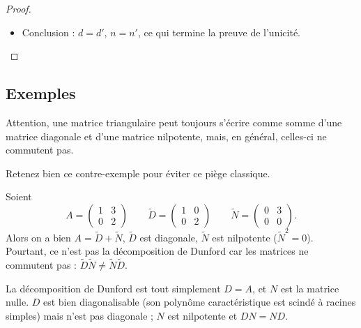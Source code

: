 \documentclass[12pt, class=report,crop=false]{standalone}
\begin{document}
\begin{proof}
\begin{enumerate}
\begin{itemize}
    \item Conclusion : $d=d'$, $n=n'$, ce qui termine la preuve de l'unicité. 
    
  \end{itemize}
   
\end{enumerate}
\end{proof}



\subsection{Exemples}



Attention, une matrice triangulaire peut toujours s'écrire 
comme somme d'une matrice diagonale et d'une matrice nilpotente, 
mais, en général, celles-ci ne commutent pas. 

Retenez bien ce contre-exemple pour éviter ce piège classique.
\begin{exemple}
Soient 
$$A = \begin{pmatrix}
1 & 3\\
0 & 2
\end{pmatrix}
\qquad \tilde D =  \begin{pmatrix}
1 & 0\\
0 & 2
\end{pmatrix}
\qquad \tilde N =  \begin{pmatrix}
0 & 3\\
0 & 0
\end{pmatrix}.$$
Alors on a bien $A = \tilde D + \tilde N$, $\tilde D$ est diagonale,
$\tilde N$ est nilpotente ($\tilde N^2 = 0$). Pourtant, ce n'est pas la décomposition de Dunford car les matrices ne commutent pas : $\tilde D \tilde N \neq \tilde N \tilde D$.
 
La décomposition de Dunford est tout simplement $D = A$, et $N$ est la matrice nulle.
$D$ est bien diagonalisable (son polynôme caractéristique est scindé à racines simples)
mais n'est pas diagonale ; $N$ est nilpotente et $DN=ND$. 
\end{exemple}

\bigskip
\end{document}
